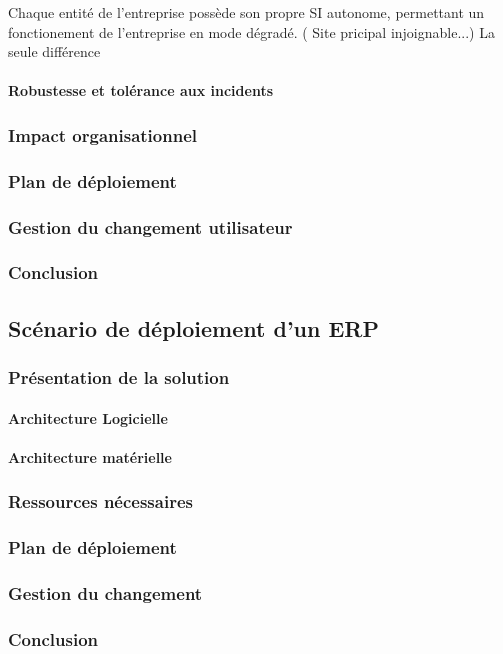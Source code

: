 Chaque entité de l'entreprise possède son propre SI autonome, permettant un fonctionement de l'entreprise en mode dégradé. ( Site pricipal injoignable...)
La seule différence 

\paragraph{Robustesse et tolérance aux incidents}

\subsubsection{Impact organisationnel}

\subsubsection{Plan de déploiement}

\subsubsection{Gestion du changement utilisateur}

\subsubsection{Conclusion}

\subsection{Scénario de déploiement d'un ERP}

\subsubsection{Présentation de la solution}
\paragraph{Architecture Logicielle}

\paragraph{Architecture matérielle}

\subsubsection{Ressources nécessaires}

\subsubsection{Plan de déploiement}

\subsubsection{Gestion du changement}

\subsubsection{Conclusion}